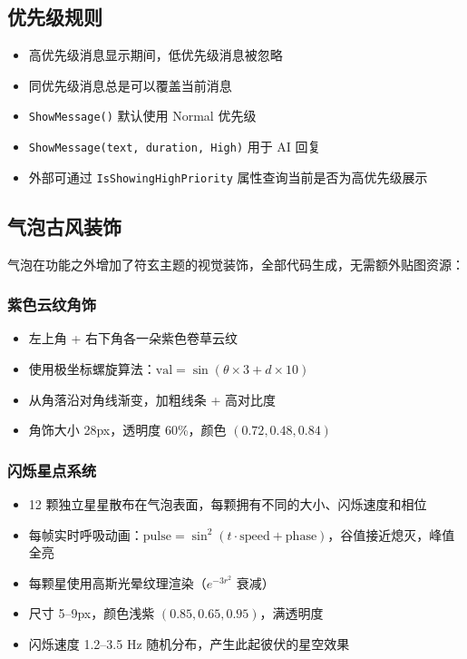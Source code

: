 \documentclass[12pt,a4paper]{ctexart}
\begin{document}
\subsection{优先级规则}

\begin{itemize}
    \item 高优先级消息显示期间，低优先级消息被忽略
    \item 同优先级消息总是可以覆盖当前消息
    \item \texttt{ShowMessage()} 默认使用 Normal 优先级
    \item \texttt{ShowMessage(text, duration, High)} 用于 AI 回复
    \item 外部可通过 \texttt{IsShowingHighPriority} 属性查询当前是否为高优先级展示
\end{itemize}

\subsection{气泡古风装饰}

气泡在功能之外增加了符玄主题的视觉装饰，全部代码生成，无需额外贴图资源：

\subsubsection{紫色云纹角饰}
\begin{itemize}
    \item 左上角 + 右下角各一朵紫色卷草云纹
    \item 使用极坐标螺旋算法：$\text{val} = \sin(\theta \times 3 + d \times 10)$
    \item 从角落沿对角线渐变，加粗线条 + 高对比度
    \item 角饰大小 28px，透明度 60\%，颜色 $(0.72, 0.48, 0.84)$
\end{itemize}

\subsubsection{闪烁星点系统}
\begin{itemize}
    \item 12 颗独立星星散布在气泡表面，每颗拥有不同的大小、闪烁速度和相位
    \item 每帧实时呼吸动画：$\text{pulse} = \sin^2(t \cdot \text{speed} + \text{phase})$，谷值接近熄灭，峰值全亮
    \item 每颗星使用高斯光晕纹理渲染（$e^{-3r^2}$ 衰减）
    \item 尺寸 5--9px，颜色浅紫 $(0.85, 0.65, 0.95)$，满透明度
    \item 闪烁速度 1.2--3.5 Hz 随机分布，产生此起彼伏的星空效果
\end{itemize}
\end{document}
